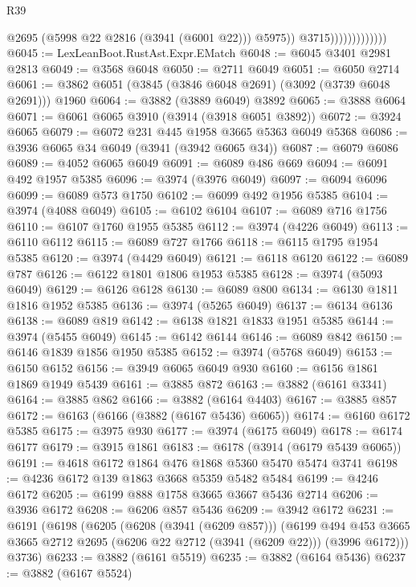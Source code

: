 \begin{lexlean}{R39}
\begin{coremodule}
                                  @2695
                                  (@5998 @22 @2816 (@3941 (@6001 @22)))
                                  @5975))
                              @3715)))))))))))))
@6045 := LexLeanBoot.RustAst.Expr.EMatch
@6048 := @6045 @3401 @2981 @2813
@6049 := @3568 @6048
@6050 := @2711 @6049
@6051 := @6050 @2714
@6061 := @3862 @6051 (@3845 (@3846 @6048 @2691) (@3092 (@3739 @6048 @2691))) @1960
@6064 := @3882 (@3889 @6049) @3892
@6065 := @3888 @6064
@6071 := @6061 @6065 @3910 (@3914 (@3918 @6051 @3892))
@6072 := @3924 @6065
@6079 := @6072 @231 @445 @1958 @3665 @5363 @6049 @5368
@6086 := @3936 @6065 @34 @6049 (@3941 (@3942 @6065 @34))
@6087 := @6079 @6086
@6089 := @4052 @6065 @6049
@6091 := @6089 @486 @669
@6094 := @6091 @492 @1957 @5385
@6096 := @3974 (@3976 @6049)
@6097 := @6094 @6096
@6099 := @6089 @573 @1750
@6102 := @6099 @492 @1956 @5385
@6104 := @3974 (@4088 @6049)
@6105 := @6102 @6104
@6107 := @6089 @716 @1756
@6110 := @6107 @1760 @1955 @5385
@6112 := @3974 (@4226 @6049)
@6113 := @6110 @6112
@6115 := @6089 @727 @1766
@6118 := @6115 @1795 @1954 @5385
@6120 := @3974 (@4429 @6049)
@6121 := @6118 @6120
@6122 := @6089 @787
@6126 := @6122 @1801 @1806 @1953 @5385
@6128 := @3974 (@5093 @6049)
@6129 := @6126 @6128
@6130 := @6089 @800
@6134 := @6130 @1811 @1816 @1952 @5385
@6136 := @3974 (@5265 @6049)
@6137 := @6134 @6136
@6138 := @6089 @819
@6142 := @6138 @1821 @1833 @1951 @5385
@6144 := @3974 (@5455 @6049)
@6145 := @6142 @6144
@6146 := @6089 @842
@6150 := @6146 @1839 @1856 @1950 @5385
@6152 := @3974 (@5768 @6049)
@6153 := @6150 @6152
@6156 := @3949 @6065 @6049 @930
@6160 := @6156 @1861 @1869 @1949 @5439
@6161 := @3885 @872
@6163 := @3882 (@6161 @3341)
@6164 := @3885 @862
@6166 := @3882 (@6164 @4403)
@6167 := @3885 @857
@6172 := @6163 (@6166 (@3882 (@6167 @5436) @6065))
@6174 := @6160 @6172 @5385
@6175 := @3975 @930
@6177 := @3974 (@6175 @6049)
@6178 := @6174 @6177
@6179 := @3915 @1861
@6183 := @6178 (@3914 (@6179 @5439 @6065))
@6191 := @4618 @6172 @1864 @476 @1868 @5360 @5470 @5474 @3741
@6198 := @4236 @6172 @139 @1863 @3668 @5359 @5482 @5484
@6199 := @4246 @6172
@6205 := @6199 @888 @1758 @3665 @3667 @5436 @2714
@6206 := @3936 @6172
@6208 := @6206 @857 @5436
@6209 := @3942 @6172
@6231 := @6191
    (@6198
      (@6205
        (@6208 (@3941 (@6209 @857)))
        (@6199
          @494
          @453
          @3665
          @3665
          @2712
          @2695
          (@6206 @22 @2712 (@3941 (@6209 @22)))
          (@3996 @6172)))
      @3736)
@6233 := @3882 (@6161 @5519)
@6235 := @3882 (@6164 @5436)
@6237 := @3882 (@6167 @5524)

\end{coremodule}
\end{lexlean}

